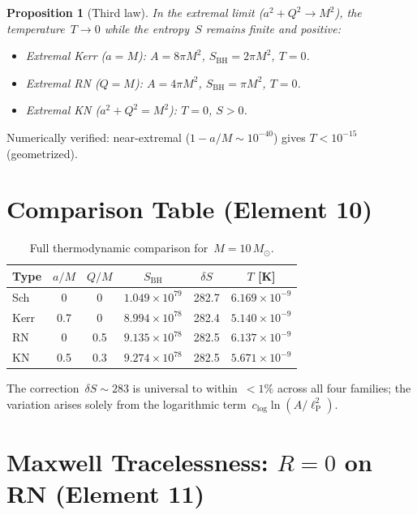 \documentclass[11pt,a4paper]{article}
\newtheorem{proposition}[theorem]{Proposition}
\newcommand{\lP}{\ell_{\mathrm{P}}}
\newcommand{\Msun}{M_\odot}
\newcommand{\clog}{c_{\log}}
\begin{document}
\begin{proposition}[Third law]\label{prop:third-law}
In the extremal limit ($a^2 + Q^2 \to M^2$), the temperature~$T \to 0$
while the entropy~$S$ remains finite and positive:
\begin{itemize}
  \item Extremal Kerr ($a = M$): $A = 8\pi M^2$,\;
        $S_{\mathrm{BH}} = 2\pi M^2$,\; $T = 0$.
  \item Extremal RN ($Q = M$): $A = 4\pi M^2$,\;
        $S_{\mathrm{BH}} = \pi M^2$,\; $T = 0$.
  \item Extremal KN ($a^2 + Q^2 = M^2$): $T = 0$,\; $S > 0$.
\end{itemize}
\end{proposition}

Numerically verified: near-extremal ($1 - a/M \sim 10^{-40}$) gives
$T < 10^{-15}$ (geometrized).

\section{Comparison Table (Element 10)}\label{sec:table}

\begin{table}[h]
\centering
\caption{Full thermodynamic comparison for~$M = 10\,\Msun$.}
\label{tab:comparison}
\begin{tabular}{lccccc}
\toprule
Type & $a/M$ & $Q/M$ & $S_{\mathrm{BH}}$ & $\delta S$ & $T$ [K] \\
\midrule
Sch  & 0   & 0   & $1.049\times 10^{79}$ & 282.7 & $6.169\times 10^{-9}$ \\
Kerr & 0.7 & 0   & $8.994\times 10^{78}$ & 282.4 & $5.140\times 10^{-9}$ \\
RN   & 0   & 0.5 & $9.135\times 10^{78}$ & 282.5 & $6.137\times 10^{-9}$ \\
KN   & 0.5 & 0.3 & $9.274\times 10^{78}$ & 282.5 & $5.671\times 10^{-9}$ \\
\bottomrule
\end{tabular}
\end{table}

The correction~$\delta S \sim 283$ is universal to within~$< 1\%$
across all four families; the variation arises solely from the
logarithmic term~$\clog\ln(A/\lP^2)$.

\section{Maxwell Tracelessness: $R = 0$ on RN (Element 11)}
\label{sec:R-zero}
\end{document}
